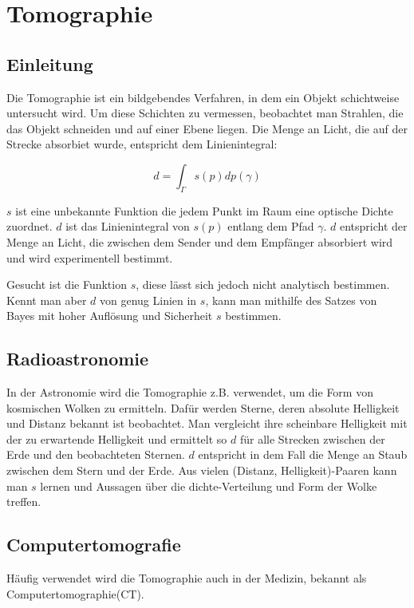 \section{Tomographie}\label{k4.2.comptomo.ct}
\subsection{Einleitung}

Die Tomographie ist ein bildgebendes Verfahren, in dem ein Objekt schichtweise untersucht wird. Um diese Schichten zu vermessen, beobachtet man Strahlen, die das Objekt schneiden und auf einer Ebene liegen. Die Menge an Licht, die auf der Strecke absorbiet wurde, entspricht dem Linienintegral:

$$d=\int_{\Gamma}{}s(p)dp(\gamma)$$

$s$ ist eine unbekannte Funktion die jedem Punkt im Raum eine optische Dichte zuordnet. $d$ ist das Linienintegral von $s(p)$ entlang dem Pfad $\gamma$. $d$ entspricht der Menge an Licht, die zwischen dem Sender und dem Empfänger absorbiert wird und wird experimentell bestimmt.

Gesucht ist die Funktion $s$, diese lässt sich jedoch nicht analytisch bestimmen. Kennt man aber $d$ von genug Linien in $s$, kann man mithilfe des Satzes von Bayes mit hoher Auflösung und Sicherheit $s$ bestimmen.

\subsection{Radioastronomie}

In der Astronomie wird die Tomographie z.B. verwendet, um die Form von kosmischen Wolken zu ermitteln. Dafür werden Sterne, deren absolute Helligkeit und Distanz bekannt ist beobachtet. Man vergleicht ihre scheinbare Helligkeit mit der zu erwartende Helligkeit und ermittelt so $d$ für alle Strecken zwischen der Erde und den beobachteten Sternen. $d$ entspricht in dem Fall die Menge an Staub zwischen dem Stern und der Erde. Aus vielen (Distanz, Helligkeit)-Paaren kann man $s$ lernen und Aussagen über die dichte-Verteilung und Form der Wolke treffen.

\subsection{Computertomografie}

Häufig verwendet wird die Tomographie auch in der Medizin, bekannt als Computertomographie(CT).

